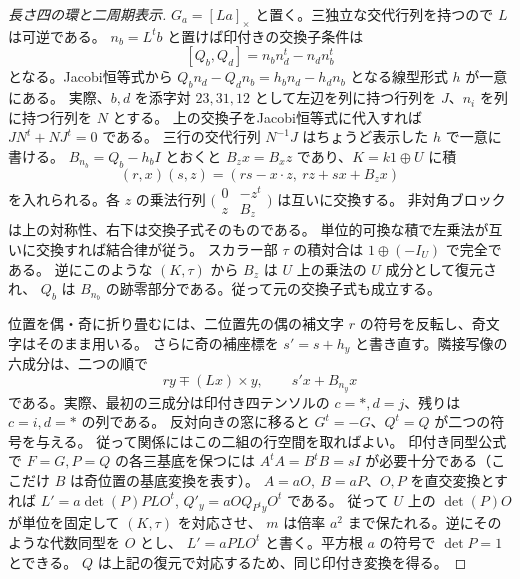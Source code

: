 \begin{proof}[長さ四の環と二周期表示]
$G_a=[La]_\times$ と置く。三独立な交代行列を持つので $L$ は可逆である。
$n_b=L^t b$ と置けば印付きの交換子条件は
\[
 [Q_b,Q_d]=n_b n_d^t-n_d n_b^t
\]
となる。Jacobi恒等式から $Q_b n_d-Q_d n_b=h_b n_d-h_d n_b$ となる線型形式 $h$ が一意にある。
実際、$b,d$ を添字対 $23,31,12$ として左辺を列に持つ行列を $J$、$n_i$ を列に持つ行列を $N$ とする。
上の交換子をJacobi恒等式に代入すれば $JN^t+NJ^t=0$ である。
三行の交代行列 $N^{-1}J$ はちょうど表示した $h$ で一意に書ける。
$B_{n_b}=Q_b-h_b I$ とおくと $B_z x=B_x z$ であり、$K=k1\oplus U$ に積
\[
 (r,x)(s,z)=(rs-x\cdot z,\ rz+sx+B_z x)
\]
を入れられる。各 $z$ の乗法行列
$\bigl(\begin{smallmatrix}0&-z^t\\ z&B_z\end{smallmatrix}\bigr)$ は互いに交換する。
非対角ブロックは上の対称性、右下は交換子式そのものである。
単位的可換な積で左乗法が互いに交換すれば結合律が従う。
スカラー部 $\tau$ の積対合は $1\oplus(-I_U)$ で完全である。
逆にこのような $(K,\tau)$ から $B_z$ は $U$ 上の乗法の $U$ 成分として復元され、
$Q_b$ は $B_{n_b}$ の跡零部分である。従って元の交換子式も成立する。

位置を偶・奇に折り畳むには、二位置先の偶の補文字 $r$ の符号を反転し、奇文字はそのまま用いる。
さらに奇の補座標を $s'=s+h_y$ と書き直す。隣接写像の六成分は、二つの順で
\[
           r y\mp (Lx)\times y,\qquad s'x+B_{n_y} x
\]
である。実際、最初の三成分は印付き四テンソルの $c=*,d=j$、残りは $c=i,d=*$ の列である。
反対向きの窓に移ると $G^t=-G$、$Q^t=Q$ が二つの符号を与える。
従って関係にはこの二組の行空間を取ればよい。
印付き同型公式で $F=G,P=Q$ の各三基底を保つには
$A^tA=B^t B=sI$ が必要十分である（ここだけ $B$ は奇位置の基底変換を表す）。
$A=a O,\ B=a P$、$O,P$ を直交変換とすれば
$L'=a\det(P)P L O^t$, $Q'_y=a O Q_{P^ty}O^t$ である。
従って $U$ 上の $\det(P)O$ が単位を固定して $(K,\tau)$ を対応させ、
$m$ は倍率 $a^2$ まで保たれる。逆にそのような代数同型を $O$ とし、
$L'=a P L O^t$ と書く。平方根 $a$ の符号で $\det P=1$ とできる。
$Q$ は上記の復元で対応するため、同じ印付き変換を得る。
\end{proof}

